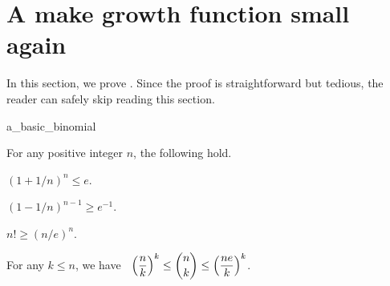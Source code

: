 \section{A make growth function small again}


In this section, we prove . Since the
proof is straightforward but tedious, the reader can safely skip
reading this section.

\begin{fragment}{a_basic_binomial}
    \begin{lemma}
        For any positive integer $n$, the following hold.
        \smallskip        
        \begin{compactenumi}
            \item $(1+1/n)^n \leq e$.

            \smallskip        
            \item $(1-1/n)^{n-1} \geq e^{-1}$.
            
            \smallskip        
            \item $n! \geq (n/e)^n$.
            
            \smallskip        
            \item  For any $k \leq n$, we have $\;\;\displaystyle
            \pth{\frac{n}{k}}^k \leq \binom{n}{k} \leq \pth{\frac{n
                  e}{k}}^k$.
        \end{compactenumi}
        
    \end{lemma}
\end{fragment}

